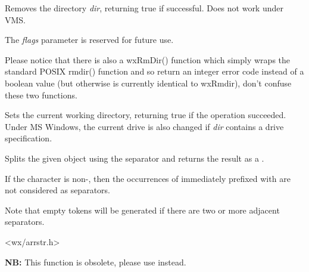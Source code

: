 \label{wxrmdir}


Removes the directory {\it dir}, returning true if successful. Does not work under VMS.

The {\it flags} parameter is reserved for future use.

Please notice that there is also a wxRmDir() function which simply wraps the
standard POSIX rmdir() function and so return an integer error code instead of
a boolean value (but otherwise is currently identical to wxRmdir), don't
confuse these two functions.


\label{wxsetworkingdirectory}


Sets the current working directory, returning true if the operation succeeded.
Under MS Windows, the current drive is also changed if {\it dir} contains a drive specification.


\label{wxsplit}


Splits the given  object using the separator  and returns the
result as a .

If the  character is non-\NULL, then the occurrences of  immediately prefixed
with  are not considered as separators.

Note that empty tokens will be generated if there are two or more adjacent separators.




<wx/arrstr.h>


\label{wxsplitfunction}


{\bf NB:} This function is obsolete, please use
 instead.

